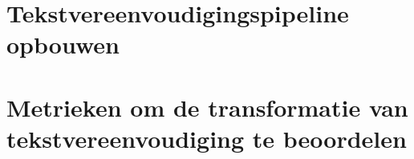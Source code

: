 \section{Tekstvereenvoudigingspipeline opbouwen}

\section{Metrieken om de transformatie van tekstvereenvoudiging te beoordelen}






\lipsum[7-20]
